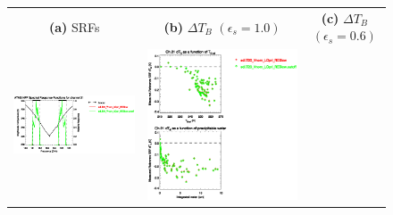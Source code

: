 \begin{figure}[H]
  \centering
  \begin{tabular}{c c c}
    \textsf{\textbf{(a)} SRFs} &
    \textsf{\textbf{(b)} $\Delta T_B$ $(\epsilon_s = 1.0)$} &
    \textsf{\textbf{(c)} $\Delta T_B$ $(\epsilon_s = 0.6)$} \\
    \includegraphics[bb=80 400 280 558,clip,scale=0.85]{graphics/srf/Rset/atms_npp.ch21.osrf.eps} &
    \includegraphics[bb=85 400 260 558,clip,scale=0.85]{graphics/dtb/Rset/e1.0_r0.0/atms_npp.ch21.dTb.eps} & 

\end{tabular}
\end{figure}
